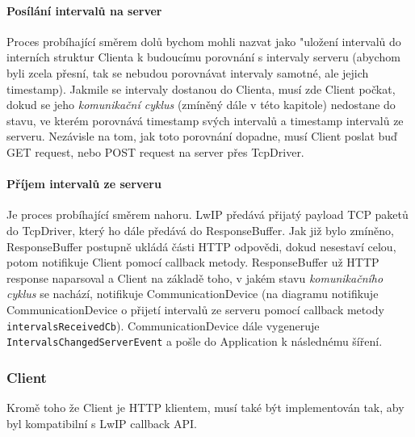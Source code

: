\paragraph{Posílání intervalů na server}
Proces probíhající směrem dolů bychom mohli nazvat jako "uložení intervalů do interních
struktur Clienta k budoucímu porovnání s intervaly serveru (abychom byli zcela přesní, tak se
nebudou porovnávat intervaly samotné, ale jejich timestamp).
Jakmile se intervaly dostanou do Clienta, musí zde Client počkat, dokud se jeho \emph{komunikační cyklus}
(zmíněný dále v této kapitole) nedostane do stavu, ve kterém porovnává timestamp svých intervalů
a timestamp intervalů ze serveru.
Nezávisle na tom, jak toto porovnání dopadne, musí Client poslat buď GET request, nebo POST request
na server přes TcpDriver.

\paragraph{Příjem intervalů ze serveru}
Je proces probíhající směrem nahoru.
LwIP předává přijatý payload TCP paketů do TcpDriver, který ho dále předává do ResponseBuffer.
Jak již bylo zmíněno, ResponseBuffer postupně ukládá části HTTP odpovědi, dokud nesestaví celou,
potom notifikuje Client pomocí callback metody.
ResponseBuffer už HTTP response naparsoval a Client na základě toho, v jakém stavu \emph{komunikačního cyklus}
se nachází, notifikuje CommunicationDevice (na diagramu notifikuje CommunicationDevice o přijetí
intervalů ze serveru pomocí callback metody \texttt{intervalsReceivedCb}).
CommunicationDevice dále vygeneruje \texttt{IntervalsChangedServerEvent} a pošle do Application
k následnému šíření.

\subsubsection{Client}
Kromě toho že Client je HTTP klientem, musí také být implementován tak, aby byl kompatibilní s LwIP
callback API.

